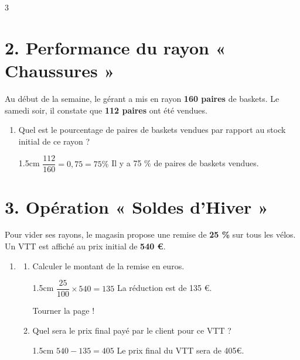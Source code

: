 \documentclass[a4paper]{book}
\begin{document}
{\begin{exerciceNote}{3}
        \section*{2. Performance du rayon « Chaussures »}
        Au début de la semaine, le gérant a mis en rayon \textbf{160 paires} de baskets. Le samedi soir, il constate que \textbf{112 paires} ont été vendues.
        
        \begin{enumerate}[resume, leftmargin=*]
            \item Quel est le pourcentage de paires de baskets vendues par rapport au stock initial de ce rayon ?
    
            \begin{ZoneReponse}{1.5cm}    
                $\dfrac{112}{160}=0,75=75\%$ 
                \quad Il y a 75 \% de paires de baskets vendues.
            \end{ZoneReponse}
        \end{enumerate}
        
        \section*{3. Opération « Soldes d'Hiver »}
        Pour vider ses rayons, le magasin propose une remise de \textbf{25 \%} sur tous les vélos. Un VTT est affiché au prix initial de \textbf{540 \euro}.

        \begin{enumerate}[resume, leftmargin=*]
            \item \begin{enumerate}[label=\alph*), leftmargin=*]
                \item Calculer le montant de la remise en euros.
                
                \begin{ZoneReponse}{1.5cm}        
                    $\dfrac{25}{100}\times540=135$
                    \quad La réduction est de 135 €.
                \end{ZoneReponse}

\vfill
\hfill Tourner la page !

\newpage
                
                \item Quel sera le prix final payé par le client pour ce VTT ?
                
                \begin{ZoneReponse}{1.5cm}
                    $540-135=405$ \quad Le prix final du VTT sera de 405€.
                \end{ZoneReponse}
            \end{enumerate}
        \end{enumerate}
        

\end{exerciceNote}}
\end{document}
